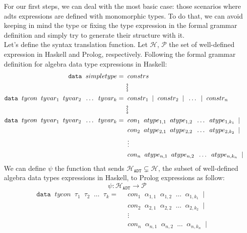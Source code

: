 \documentclass{report}
\theoremstyle{definition}
\theoremstyle{definition}
\newcommand{\ttt}[1]{\texttt{#1}}
\newcommand{\tav}{\;\;}
\newcommand{\updownsquigarrow}{\mathrel{\rotatebox[origin=c]{-90}{$\leftrightsquigarrow$}}}
\begin{document}
For our first steps, we can deal with the most basic case: those scenarios where adts expressions are defined with monomorphic types. To do that, we can avoid keeping in mind the type or fixing the type expression in the formal grammar definition and simply try to generate their structure with it.\\

Let's define the syntax translation function. Let $\mathcal{H}$, $\mathcal{P}$ the set of well-defined expression in Haskell and Prolog, respectively. Following the formal grammar definition for algebra data type expressions in Haskell:
\begin{align*}
	\ttt{data} \tav simpletype =& \tav constrs && \\
	& \updownsquigarrow  && \\
	\ttt{data} \tav tycon \tav tyvar_1 \tav tyvar_2 \tav \ldots \tav tyvar_k 	=& \tav constr_1 \tav | \tav constr_2 \tav | \tav \ldots \tav | \tav constr_n && \\
	& \updownsquigarrow    && \\
	\ttt{data} \tav tycon \tav tyvar_1 \tav tyvar_2 \tav \ldots \tav tyvar_k 	=& \tav con_1 \tav atype_{1,1} \tav atype_{1,2} \tav \ldots \tav atype_{1,k_1} \tav | && \\
	& \tav con_2 \tav atype_{2,1} \tav atype_{2,2} \tav \ldots \tav atype_{2,k_2} \tav | && \\
	& \tav \vdots \tav && \\
	& \tav con_n \tav atype_{n,1} \tav atype_{n,2} \tav \ldots \tav atype_{n,k_n} \tav | && \\
\end{align*}
We can define $\psi$ the function that sends $\mathcal{H}_{\ttt{ADT}} \subsetneq \mathcal{H}$, the subset of well-defined algebra data types expressions in Haskell, to Prolog expressions as follow: $$\psi: \mathcal{H}_{\ttt{ADT}} \longrightarrow \mathcal{P} $$
\begin{align*}
	\ttt{data} \tav tycon \tav \tau_1 \tav \tau_2 \tav \ldots \tav \tau_k 	=& \tav con_1 \tav \alpha_{1,1} \tav \alpha_{1,2} \tav \ldots \tav \alpha_{1,k_1} \tav | && \\
	& \tav con_2 \tav \alpha_{2,1} \tav \alpha_{2,2} \tav \ldots \tav \alpha_{2,k_2} \tav | && \\
	& \tav \vdots \tav && \\
	& \tav con_n \tav \alpha_{n,1} \tav \alpha_{n,2} \tav \ldots \tav \alpha_{n,k_n} \tav | && \\
\end{align*}
\end{document}
